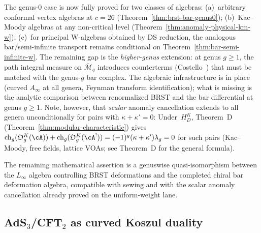 \begin{remark}[Scope]\label{rem:anomaly-scope}
The genus-$0$ case is now fully proved for two classes of
algebras:
(a)~arbitrary conformal vertex algebras at $c = 26$
(Theorem~\ref{thm:brst-bar-genus0});
(b)~Kac--Moody algebras at any non-critical level
(Theorem~\ref{thm:anomaly-physical-km-w});
(c)~for principal W-algebras obtained by DS reduction, the analogous
bar/semi-infinite transport remains conditional on
Theorem~\ref{thm:bar-semi-infinite-w}.
The remaining gap is the \emph{higher-genus} extension: at genus
$g \geq 1$, the path integral measure on
$\overline{\mathcal{M}}_g$ introduces counterterms
(Costello~\cite{costello-renormalization}) that must be matched
with the genus-$g$ bar complex. The algebraic infrastructure
is in place (curved $A_\infty$ at all genera, Feynman transform
identification); what is missing is the analytic comparison
between renormalized BRST and the bar differential at genus
$g \geq 1$. Note, however, that \emph{scalar} anomaly
cancellation extends to all genera unconditionally
for pairs with $\kappa + \kappa' = 0$:
Under~$H_D^K$, Theorem~D (Theorem~\ref{thm:modular-characteristic})
gives
$\operatorname{ch}_g(\mathfrak O_g^K(\cA))
+\operatorname{ch}_g(\mathfrak O_g^K(\cA^!))
=(-1)^g(\kappa+\kappa')\lambda_g=0$
for such pairs (Kac--Moody, free fields, lattice VOAs; see Theorem~D for the general formula).

The remaining mathematical assertion is a genuswise
quasi-isomorphism between the $L_\infty$ algebra controlling BRST
deformations and the completed chiral bar deformation algebra,
compatible with sewing and with the scalar anomaly cancellation
already proved on the uniform-weight lane.
\end{remark}

\subsection{\texorpdfstring{AdS$_3$/CFT$_2$ as curved Koszul duality}{AdS3/CFT2 as curved Koszul duality}}
\label{subsec:ads-cft-koszul}

